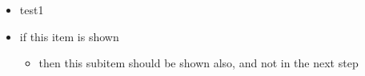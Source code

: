 \documentclass{beamer}
\begin{document}
\begin{frame}
    \begin{itemize}[<+->]
        \item test1
        \item if this item is shown
        \begin{itemize}[<.->]
            \item then this subitem should be shown also, and not in the next step
        \end{itemize}
    \end{itemize}
\end{frame}
\end{document}
